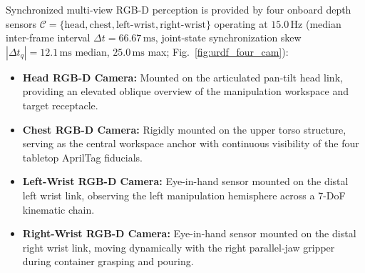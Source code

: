 \documentclass[10pt,journal]{IEEEtran}
\begin{document}
Synchronized multi-view RGB-D perception is provided by four onboard depth sensors $\mathcal{C} = \{\text{head}, \text{chest}, \text{left-wrist}, \text{right-wrist}\}$ operating at $15.0\,\mathrm{Hz}$ (median inter-frame interval $\Delta t = 66.67\,\mathrm{ms}$, joint-state synchronization skew $|\Delta t_q| = 12.1\,\mathrm{ms}$ median, $25.0\,\mathrm{ms}$ max; Fig.~\ref{fig:urdf_four_cam}):
\begin{itemize}
    \item \textbf{Head RGB-D Camera:} Mounted on the articulated pan-tilt head link, providing an elevated oblique overview of the manipulation workspace and target receptacle.
    \item \textbf{Chest RGB-D Camera:} Rigidly mounted on the upper torso structure, serving as the central workspace anchor with continuous visibility of the four tabletop AprilTag fiducials.
    \item \textbf{Left-Wrist RGB-D Camera:} Eye-in-hand sensor mounted on the distal left wrist link, observing the left manipulation hemisphere across a 7-DoF kinematic chain.
    \item \textbf{Right-Wrist RGB-D Camera:} Eye-in-hand sensor mounted on the distal right wrist link, moving dynamically with the right parallel-jaw gripper during container grasping and pouring.
\end{itemize}
\end{document}
